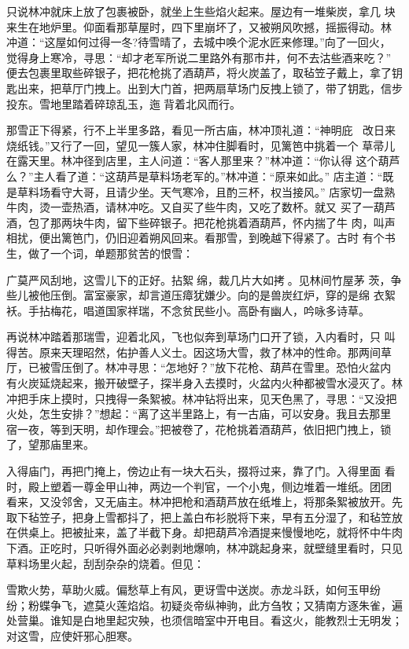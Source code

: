只说林冲就床上放了包裹被卧，就坐上生些焰火起来。屋边有一堆柴炭，拿几
块来生在地炉里。仰面看那草屋时，四下里崩坏了，又被朔风吹撼，摇振得动。林
冲道：“这屋如何过得一冬?待雪晴了，去城中唤个泥水匠来修理。”向了一回火，
觉得身上寒冷，寻思：“却才老军所说二里路外有那市井，何不去沽些酒来吃？”
便去包裹里取些碎银子，把花枪挑了酒葫芦，将火炭盖了，取毡笠子戴上，拿了钥
匙出来，把草厅门拽上。出到大门首，把两扇草场门反拽上锁了，带了钥匙，信步
投东。雪地里踏着碎琼乱玉，迤背着北风而行。

那雪正下得紧，行不上半里多路，看见一所古庙，林冲顶礼道：“神明庇，
改日来烧纸钱。”又行了一回，望见一簇人家，林冲住脚看时，见篱笆中挑着一个
草帚儿在露天里。林冲径到店里，主人问道：“客人那里来？”林冲道：“你认得
这个葫芦么？”主人看了道：“这葫芦是草料场老军的。”林冲道：“原来如此。”
店主道：“既是草料场看守大哥，且请少坐。天气寒冷，且酌三杯，权当接风。”
店家切一盘熟牛肉，烫一壶热酒，请林冲吃。又自买了些牛肉，又吃了数杯。就又
买了一葫芦酒，包了那两块牛肉，留下些碎银子。把花枪挑着酒葫芦，怀内揣了牛
肉，叫声相扰，便出篱笆门，仍旧迎着朔风回来。看那雪，到晚越下得紧了。古时
有个书生，做了一个词，单题那贫苦的恨雪：

广莫严风刮地，这雪儿下的正好。拈絮绵，裁几片大如拷。见林间竹屋茅
茨，争些儿被他压倒。富室豪家，却言道压瘴犹嫌少。向的是兽炭红炉，穿的是绵
衣絮袄。手拈梅花，唱道国家祥瑞，不念贫民些小。高卧有幽人，吟咏多诗草。

再说林冲踏着那瑞雪，迎着北风，飞也似奔到草场门口开了锁，入内看时，只
叫得苦。原来天理昭然，佑护善人义士。因这场大雪，救了林冲的性命。那两间草
厅，已被雪压倒了。林冲寻思：“怎地好？”放下花枪、葫芦在雪里。恐怕火盆内
有火炭延烧起来，搬开破壁子，探半身入去摸时，火盆内火种都被雪水浸灭了。林
冲把手床上摸时，只拽得一条絮被。林冲钻将出来，见天色黑了，寻思：“又没把
火处，怎生安排？”想起：“离了这半里路上，有一古庙，可以安身。我且去那里
宿一夜，等到天明，却作理会。”把被卷了，花枪挑着酒葫芦，依旧把门拽上，锁
了，望那庙里来。

入得庙门，再把门掩上，傍边止有一块大石头，掇将过来，靠了门。入得里面
看时，殿上塑着一尊金甲山神，两边一个判官，一个小鬼，侧边堆着一堆纸。团团
看来，又没邻舍，又无庙主。林冲把枪和酒葫芦放在纸堆上，将那条絮被放开。先
取下毡笠子，把身上雪都抖了，把上盖白布衫脱将下来，早有五分湿了，和毡笠放
在供桌上。把被扯来，盖了半截下身。却把葫芦冷酒提来慢慢地吃，就将怀中牛肉
下酒。正吃时，只听得外面必必剥剥地爆响，林冲跳起身来，就壁缝里看时，只见
草料场里火起，刮刮杂杂的烧着。但见：

雪欺火势，草助火威。偏愁草上有风，更讶雪中送炭。赤龙斗跃，如何玉甲纷
纷；粉蝶争飞，遮莫火莲焰焰。初疑炎帝纵神驹，此方刍牧；又猜南方逐朱雀，遍
处营巢。谁知是白地里起灾殃，也须信暗室中开电目。看这火，能教烈士无明发；
对这雪，应使奸邪心胆寒。

